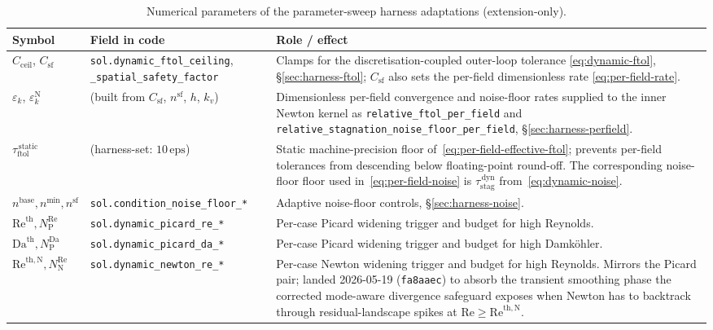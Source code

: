 \documentclass{article}
\newcommand{\code}[1]{\texttt{\small #1}}
\newcommand{\textftol}{\tau_{\mathrm{ftol}}}
\newcommand{\textstag}{\tau_{\mathrm{stag}}}
\newcommand{\extline}[1]{{\color{extcolor}#1}}
\begin{document}
\begin{table}[h]
\centering
\caption{\extline{Numerical parameters of the parameter-sweep harness adaptations (extension-only).}}
\label{tab:harness-params}
\footnotesize
\textcolor{extcolor}{%
\begin{tabularx}{\textwidth}{@{} l l X @{}}
\toprule
\textbf{Symbol} & \textbf{Field in code} & \textbf{Role / effect} \\
\midrule
$C_{\mathrm{ceil}}$, $C_{\mathrm{sf}}$ & \code{sol.dynamic\_ftol\_ceiling}, \code{\_spatial\_safety\_factor} & Clamps for the discretisation-coupled outer-loop tolerance \eqref{eq:dynamic-ftol}, \S\ref{sec:harness-ftol}; $C_{\mathrm{sf}}$ also sets the per-field dimensionless rate \eqref{eq:per-field-rate}. \\
$\varepsilon_{k}$, $\varepsilon^{\mathrm{N}}_{k}$ & (built from $C_{\mathrm{sf}}$, $n^{\mathrm{sf}}$, $h$, $k_{v}$) & Dimensionless per-field convergence and noise-floor rates supplied to the inner Newton kernel as \code{relative\_ftol\_per\_field} and \code{relative\_stagnation\_noise\_floor\_per\_field}, \S\ref{sec:harness-perfield}. \\
$\textftol^{\,\mathrm{static}}$ & (harness-set: $10\,\mathrm{eps}$) & Static machine-precision floor of~\eqref{eq:per-field-effective-ftol}; prevents per-field tolerances from descending below floating-point round-off. The corresponding noise-floor floor used in~\eqref{eq:per-field-noise} is $\textstag^{\,\mathrm{dyn}}$ from~\eqref{eq:dynamic-noise}. \\
$n^{\mathrm{base}}, n^{\min}, n^{\mathrm{sf}}$ & \code{sol.condition\_noise\_floor\_*} & Adaptive noise-floor controls, \S\ref{sec:harness-noise}. \\
$\mathrm{Re}^{\mathrm{th}}, N_{\mathrm{P}}^{\mathrm{Re}}$ & \code{sol.dynamic\_picard\_re\_*} & Per-case Picard widening trigger and budget for high Reynolds. \\
$\mathrm{Da}^{\mathrm{th}}, N_{\mathrm{P}}^{\mathrm{Da}}$ & \code{sol.dynamic\_picard\_da\_*} & Per-case Picard widening trigger and budget for high Damk\"ohler. \\
$\mathrm{Re}^{\mathrm{th,N}}, N_{\mathrm{N}}^{\mathrm{Re}}$ & \code{sol.dynamic\_newton\_re\_*} & Per-case Newton widening trigger and budget for high Reynolds. Mirrors the Picard pair; landed 2026-05-19 (\code{fa8aaec}) to absorb the transient smoothing phase the corrected mode-aware divergence safeguard exposes when Newton has to backtrack through residual-landscape spikes at $\mathrm{Re} \ge \mathrm{Re}^{\mathrm{th,N}}$. \\
\bottomrule
\end{tabularx}}
\end{table}
\end{document}
